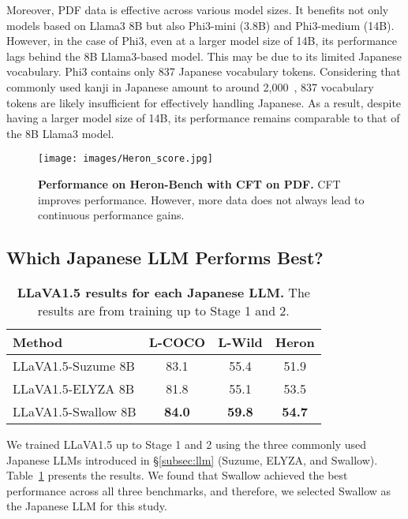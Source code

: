 Moreover, PDF data is effective across various model sizes.
It benefits not only models based on Llama3 8B but also Phi3-mini (3.8B) and Phi3-medium (14B).
However, in the case of Phi3, even at a larger model size of 14B, its performance lags behind the 8B Llama3-based model.
This may be due to its limited Japanese vocabulary. Phi3 contains only 837 Japanese vocabulary tokens.
Considering that commonly used kanji in Japanese amount to around 2,000~\cite{joyo_kanji_wiki}, 837 vocabulary tokens are likely insufficient for effectively handling Japanese.
As a result, despite having a larger model size of 14B, its performance remains comparable to that of the 8B Llama3 model.


\begin{figure}[t]
  \texttt{[image: images/Heron\_score.jpg]}
  \vspace{-6mm}
  \caption{\textbf{Performance on Heron-Bench with CFT on PDF.}
CFT improves performance.
However, more data does not always lead to continuous performance gains.
  }
  \label{fig:heron-score}
\end{figure}



\subsection{Which Japanese LLM Performs Best?}
\begin{table}[t]
    \centering
    \begin{adjustbox}{width=\linewidth}
    \begin{tabular}{@{}lccc@{}}
        \toprule
        \textbf{Method} & \textbf{L-COCO} & \textbf{L-Wild} &  \textbf{Heron} \\
        \midrule
        LLaVA1.5-Suzume 8B & 83.1 & 55.4 & 51.9 \\ 
        LLaVA1.5-ELYZA 8B & 81.8 & 55.1 & 53.5 \\ 
        LLaVA1.5-Swallow 8B & \textbf{84.0} & \textbf{59.8} & \textbf{54.7} \\ 
        \bottomrule
    \end{tabular}
    \end{adjustbox}
    \vspace{-2mm}
    \caption{\textbf{LLaVA1.5 results for each Japanese LLM.}
The results are from training up to Stage 1 and 2.
    }
    \label{tab:ja-llm}
\end{table}

We trained LLaVA1.5 up to Stage 1 and 2 using the three commonly used Japanese LLMs introduced in \S\ref{subsec:llm} (Suzume, ELYZA, and Swallow).
Table~\ref{tab:ja-llm} presents the results.
We found that Swallow achieved the best performance across all three benchmarks, and therefore, we selected Swallow as the Japanese LLM for this study.



